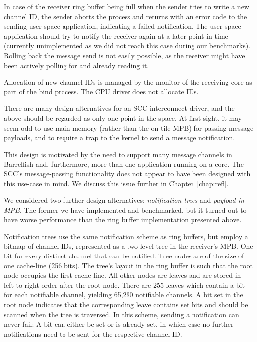 \documentclass[a4paper,twoside]{report} %
\begin{document}
In case of the receiver ring buffer being full when the sender tries
to write a new channel ID, the sender aborts the process and returns
with an error code to the sending user-space application, indicating a
failed notification. The user-space application should try to notify
the receiver again at a later point in time (currently unimplemented
as we did not reach this case during our benchmarks). Rolling back the
message send is not easily possible, as the receiver might have been
actively polling for and already reading it.

Allocation of new channel IDs is managed by the monitor of the
receiving core as part of the bind process. The CPU driver does not
allocate IDs.

There are many design alternatives for an SCC interconnect driver, and
the above should be regarded as only one point in the space.  At first
sight, it may seem odd to use main memory (rather than the on-tile
MPB) for passing message payloads, and to require a trap to the kernel
to send a message notification.

This design is motivated by the need to support many message channels
in Barrelfish and, furthermore, more than one application running on a
core.  The SCC's message-passing functionality does not appear to have
been designed with this use-case in mind.
We discuss this issue further in Chapter~\ref{chap:refl}. 

We considered two further design alternatives: \emph{notification
  trees} and \emph{payload in MPB}. The former we have implemented and
benchmarked, but it turned out to have worse performance than the ring
buffer implementation presented above.

Notification trees use the same notification scheme as ring buffers,
but employ a bitmap of channel IDs, represented as a two-level tree in
the receiver's MPB. One bit for every distinct channel that can be
notified. Tree nodes are of the size of one cache-line (256 bits). The
tree's layout in the ring buffer is such that the root node occupies
the first cache-line. All other nodes are leaves and are stored in
left-to-right order after the root node. There are 255 leaves which
contain a bit for each notifiable channel, yielding 65,280 notifiable
channels. A bit set in the root node indicates that the corresponding
leave contains set bits and should be scanned when the tree is
traversed. In this scheme, sending a notification can never fail: A
bit can either be set or is already set, in which case no further
notifications need to be sent for the respective channel ID.
\end{document}

